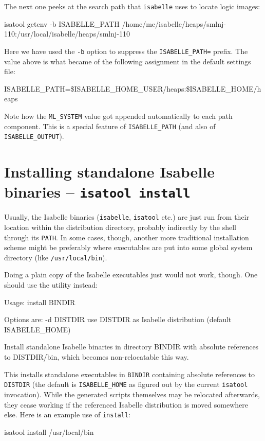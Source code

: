 The next one peeks at the search path that \texttt{isabelle} uses to
locate logic images:
\begin{ttbox}
isatool getenv -b ISABELLE_PATH
{\out /home/me/isabelle/heaps/smlnj-110:/usr/local/isabelle/heaps/smlnj-110}
\end{ttbox}
Here we have used the \texttt{-b} option to suppress the
\texttt{ISABELLE_PATH=} prefix.  The value above is what became of the
following assignment in the default settings file:
\begin{ttbox}
ISABELLE_PATH=\$ISABELLE_HOME_USER/heaps:\$ISABELLE_HOME/heaps
\end{ttbox}
Note how the \texttt{ML_SYSTEM} value got appended automatically to
each path component. This is a special feature of
\texttt{ISABELLE_PATH} (and also of \texttt{ISABELLE_OUTPUT}).


\section{Installing standalone Isabelle binaries -- \texttt{isatool install}}

Usually, the Isabelle binaries (\texttt{isabelle}, \texttt{isatool}
etc.) are just run from their location within the distribution
directory, probably indirectly by the shell through its \texttt{PATH}.
In some cases, though, another more traditional installation scheme
might be preferably where executables are put into some global system
directory (like \texttt{/usr/local/bin}).

Doing a plain copy of the Isabelle executables just would not work,
though.  One should use the  utility instead:
\begin{ttbox}
Usage: install BINDIR

  Options are:
    -d DISTDIR   use DISTDIR as Isabelle distribution
                 (default ISABELLE_HOME)

  Install standalone Isabelle binaries in directory BINDIR with absolute
  references to DISTDIR/bin, which becomes non-relocatable this way.
\end{ttbox}

This installs standalone executables in \texttt{BINDIR} containing
absolute references to \texttt{DISTDIR} (the default is
\texttt{ISABELLE_HOME} as figured out by the current \texttt{isatool}
invocation).  While the generated scripts themselves may be relocated
afterwards, they cease working if the referenced Isabelle distribution
is moved somewhere else.  Here is an example use of \texttt{install}:
\begin{ttbox}
  isatool install /usr/local/bin
\end{ttbox}


